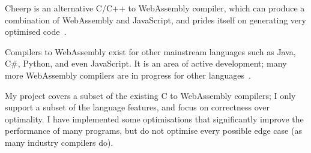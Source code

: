 \documentclass[00-main.tex]{subfiles}
\begin{document}
Cheerp is an alternative C/C++ to WebAssembly compiler, which can produce a combination of WebAssembly and JavaScript, and prides itself on generating very optimised code~.

Compilers to WebAssembly exist for other mainstream languages such as Java, C\#, Python, and even JavaScript.
It is an area of active development; many more WebAssembly compilers are in progress for other languages~.

My project covers a subset of the existing C to WebAssembly compilers; I only support a subset of the language features, and focus on correctness over optimality.
I have implemented some optimisations that significantly improve the performance of many programs, but do not optimise every possible edge case (as many industry compilers do).
\end{document}
